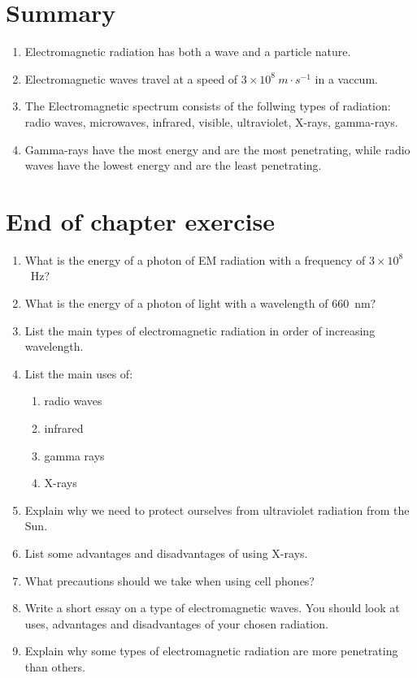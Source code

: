 \section {Summary}
\begin{enumerate}
\item Electromagnetic radiation has both a wave and a particle nature.
\item Electromagnetic waves travel at a speed of $3 \times 10^{8}~m \cdot s^{-1}$ in a vaccum.
\item The Electromagnetic spectrum consists of the follwing types of radiation: radio waves, microwaves, infrared, visible, ultraviolet, X-rays, gamma-rays.
\item Gamma-rays have the most energy and are the most penetrating, while radio waves have the lowest energy and are the least penetrating.

\end{enumerate}

\section{End of chapter exercise}
\begin{enumerate}

\item What is the energy of a photon of EM radiation with a frequency of $3 \times 10^{8}$~Hz? 

\item What is the energy of a photon of light with a wavelength of 660~nm?

\item List the main types of electromagnetic radiation in order of increasing wavelength.

\item List the main uses of:
\begin{enumerate}
\item radio waves
\item infrared
\item gamma rays
\item X-rays
\end{enumerate}

\item Explain why we need to protect ourselves from ultraviolet radiation from the Sun.

\item List some advantages and disadvantages of using X-rays.

\item What precautions should we take when using cell phones?

\item Write a short essay on a type of electromagnetic waves. You should look at uses, advantages and disadvantages of your chosen radiation.

\item Explain why some types of electromagnetic radiation are more penetrating than others.

\end{enumerate}






